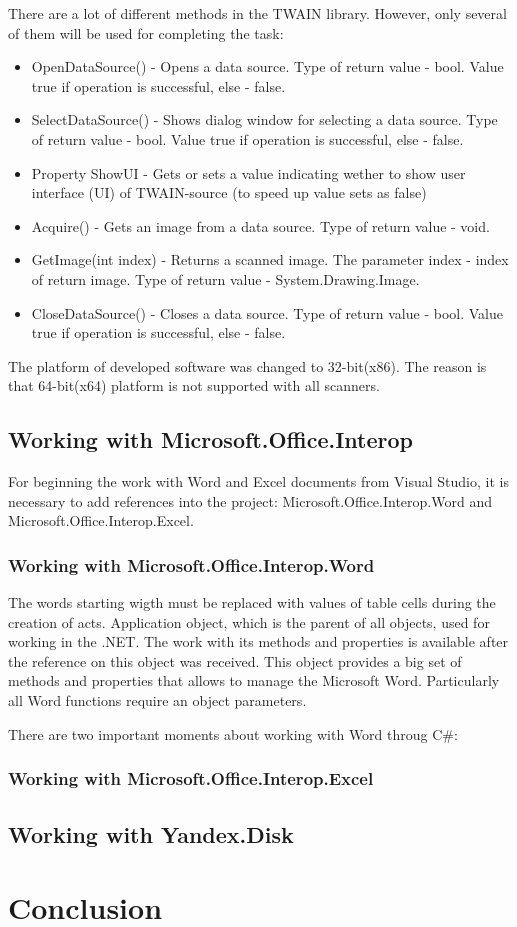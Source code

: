 \documentclass[12pt,journal,compsoc]{D:/Магистратура/English/bare_conf/IEEEtran}
\begin{document}
There are a lot of different methods in the TWAIN library. However, only several of them will be used for completing the task:
\begin{itemize}
\item OpenDataSource() - Opens a data source. Type of return value - bool. Value true if operation is successful, else - false. 
\item SelectDataSource() - Shows dialog window for selecting a data source. Type of return value - bool. Value true if operation is successful, else - false.
\item Property ShowUI - Gets or sets a value indicating wether to show user interface (UI) of TWAIN-source (to speed up value sets as false)
\item Acquire() - Gets an image from a data source. Type of return value - void. 
\item GetImage(int index) - Returns a scanned image. The parameter index - index of return image. Type of return value - System.Drawing.Image. 
\item CloseDataSource() - Closes a data source. Type of return value - bool. Value true if operation is successful, else - false.
\end{itemize}

The platform of developed software was changed to 32-bit(x86). The reason is that 64-bit(x64) platform is not supported with all scanners.

\subsection{Working with Microsoft.Office.Interop}
For beginning the work with Word and Excel documents from Visual Studio, it is necessary to add references into the project: Microsoft.Office.Interop.Word and Microsoft.Office.Interop.Excel. 

\subsubsection{Working with Microsoft.Office.Interop.Word}
The words starting wigth \@ must be replaced with values of table cells during the creation of acts. Application object, which is the parent of all objects, used for working  in the .NET. The work with its methods and properties is available after the reference on this object was received. This object provides a big set of methods and properties that allows to manage the Microsoft Word. Particularly all Word functions require an object parameters.

There are two important moments about working with Word throug C\#:


\subsubsection{Working with Microsoft.Office.Interop.Excel}

\subsection{Working with Yandex.Disk}

\section{Conclusion}
\end{document}
